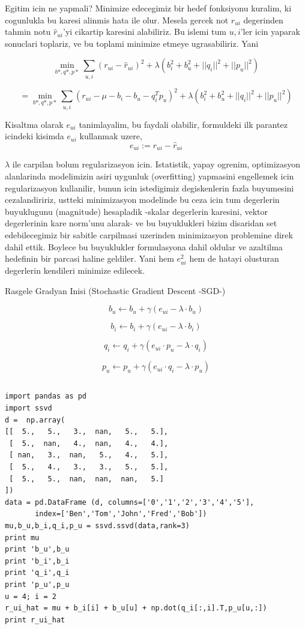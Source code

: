 \documentclass[12pt,fleqn]{article}\usepackage{../common}
\begin{document}
Egitim icin ne yapmali? Minimize edecegimiz bir hedef fonksiyonu kuralim,
ki cogunlukla bu karesi alinmis hata ile olur. Mesela gercek not
$r_{ui}$ degerinden tahmin notu $\hat{r}_{ui}$'yi cikartip karesini
alabiliriz. Bu islemi tum $u,i$'ler icin yaparak sonuclari toplariz, ve bu
toplami minimize etmeye ugrasabiliriz. Yani


$$
\min_{b*,q*,p*} \sum_{u,i} (r_{ui} - \hat{r}_{ui})^2 + 
\lambda (b_i^2 + b_u^2 + ||q_i||^2 + ||p_u||^2)
$$

$$
= \min_{b*,q*,p*} \sum_{u,i} (r_{ui} - \mu - b_i - b_u - q_i^Tp_u)^2 + 
\lambda (b_i^2 + b_u^2 + ||q_i||^2 + ||p_u||^2)
$$

Kisaltma olarak $e_{ui}$ tanimlayalim, bu faydali olabilir, formuldeki ilk
parantez icindeki kisimda $e_{ui}$ kullanmak uzere,
$$ e_{ui} := r_{ui} - \hat{r}_{ui} $$

$\lambda$ ile carpilan bolum regularizasyon icin. Istatistik, yapay
ogrenim, optimizasyon alanlarinda modelimizin asiri uygunluk (overfitting)
yapmasini engellemek icin regularizasyon kullanilir, bunun icin istedigimiz
degiskenlerin fazla buyumesini cezalandiririz, ustteki minimizasyon
modelinde bu ceza icin tum degerlerin buyuklugunu (magnitude) hesapladik
-skalar degerlerin karesini, vektor degerlerinin kare norm'unu alarak- ve
bu buyuklukleri bizim disaridan set edebilecegimiz bir sabitle carpilmasi
uzerinden minimizasyon problemine direk dahil ettik. Boylece bu buyuklukler
formulasyona dahil oldular ve azaltilma hedefinin bir parcasi haline
geldiler. Yani hem $e_{ui}^2$ hem de hatayi olusturan degerlerin kendileri
minimize edilecek.

Rasgele Gradyan Inisi (Stochastic Gradient Descent -SGD-)




$$
b_u \leftarrow b_u + \gamma (e_{ui} - \lambda \cdot b_u)
$$

$$
b_i \leftarrow b_i + \gamma (e_{ui} - \lambda \cdot b_i)
$$

$$
q_i \leftarrow q_i + \gamma (e_{ui}\cdot p_u - \lambda \cdot q_i)
$$

$$
p_u \leftarrow p_u + \gamma (e_{ui}\cdot q_i - \lambda \cdot p_u)
$$


\inputminted[fontsize=\footnotesize]{python}{ssvd.py}

\begin{verbatim}
import pandas as pd
import ssvd
d =  np.array(
[[  5.,   5.,   3.,  nan,   5.,   5.],
 [  5.,  nan,   4.,  nan,   4.,   4.],
 [ nan,   3.,  nan,   5.,   4.,   5.],
 [  5.,   4.,   3.,   3.,   5.,   5.],
 [  5.,   5.,  nan,  nan,  nan,   5.]
])
data = pd.DataFrame (d, columns=['0','1','2','3','4','5'],
       index=['Ben','Tom','John','Fred','Bob'])
mu,b_u,b_i,q_i,p_u = ssvd.ssvd(data,rank=3)
print mu
print 'b_u',b_u
print 'b_i',b_i
print 'q_i',q_i
print 'p_u',p_u
u = 4; i = 2
r_ui_hat = mu + b_i[i] + b_u[u] + np.dot(q_i[:,i].T,p_u[u,:])
print r_ui_hat
\end{verbatim}
\end{document}
